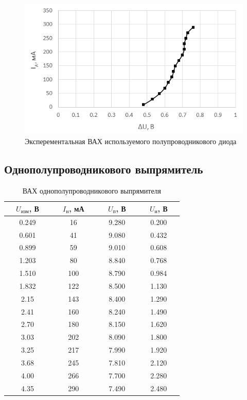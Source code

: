 \begin{figure}[H]
	\begin{center}
		\includegraphics[width=14cm]{img/1}
		\caption{Эксперементальная ВАХ используемого полупроводникового диода}
		\label{g:1} %
	\end{center}
\end{figure}

\subsection{Однополупроводникового выпрямитель}

\begin{table}[H]
	\begin{center}
	\caption{ВАХ однополупроводникового выпрямителя}
	\def\arraystretch{1.5}
		\begin{tabular}{|c|c|c|c|}
		\hline 
		\ \ $U_\text{изм}$, В\ \  & \ \ $I_\text{н}$, мА\ \  & \ \ $U_\text{п}$, В\ \  & \ \ $U_\text{н}$, В\ \  \\ \hline
		0.249 & 16 & 9.280 & 0.200 \\ \hline
		0.601 & 41 & 9.080 & 0.432 \\ \hline
		0.899 & 59 & 9.010 & 0.608 \\ \hline
		1.203 & 80 & 8.840 & 0.768 \\ \hline
		1.510 & 100 & 8.790 & 0.984 \\ \hline
		1.832 & 122 & 8.500 & 1.130 \\ \hline
		2.15 & 143 & 8.400 & 1.290 \\ \hline
		2.41 & 160 & 8.240 & 1.490 \\ \hline
		2.70 & 180 & 8.150 & 1.620 \\ \hline
		3.03 & 202 & 8.090 & 1.800 \\ \hline
		3.25 & 217 & 7.990 & 1.920 \\ \hline
		3.68 & 245 & 7.810 & 2.120 \\ \hline
		4.00 & 266 & 7.700 & 2.280 \\ \hline
		4.35 & 290 & 7.490 & 2.480 \\ \hline
		\end{tabular} 
		\label{tab:5:1}
	\end{center}
\end{table}

